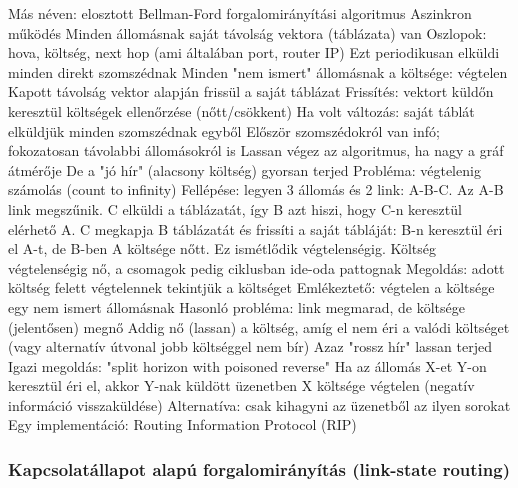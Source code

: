 \documentclass[12pt,a4paper]{article}
\begin{document}
\begin{outline}
	\1 Más néven: elosztott Bellman-Ford forgalomirányítási algoritmus
	\1 Aszinkron működés
	\1 Minden állomásnak saját távolság vektora (táblázata) van
		\2 Oszlopok: hova, költség, next hop (ami általában port, router IP)
		\2 Ezt periodikusan elküldi minden direkt szomszédnak
		\2 Minden "nem ismert" állomásnak a költsége: végtelen
	\1 Kapott távolság vektor alapján frissül a saját táblázat
		\2 Frissítés: vektort küldőn keresztül költségek ellenőrzése (nőtt/csökkent)
		\2 Ha volt változás: saját táblát elküldjük minden szomszédnak egyből
	\1 Először szomszédokról van infó; fokozatosan távolabbi állomásokról is
	\1 Lassan végez az algoritmus, ha nagy a gráf átmérője
		\2 De a "jó hír" (alacsony költség) gyorsan terjed
	\1 Probléma: végtelenig számolás (count to infinity)
		\2 Fellépése: legyen 3 állomás és 2 link: A-B-C. Az A-B link megszűnik. C elküldi a táblázatát, így B azt hiszi, hogy C-n keresztül elérhető A. C megkapja B táblázatát és frissíti a saját tábláját: B-n keresztül éri el A-t, de B-ben A költsége nőtt. Ez ismétlődik végtelenségig.
		\2 Költség végtelenségig nő, a csomagok pedig ciklusban ide-oda pattognak
		\2 Megoldás: adott költség felett végtelennek tekintjük a költséget
			\3 Emlékeztető: végtelen a költsége egy nem ismert állomásnak
		\2 Hasonló probléma: link megmarad, de költsége (jelentősen) megnő
			\3 Addig nő (lassan) a költség, amíg el nem éri a valódi költséget (vagy alternatív útvonal jobb költséggel nem bír)
			\3 Azaz "rossz hír" lassan terjed
		\2 Igazi megoldás: "split horizon with poisoned reverse"
			\3 Ha az állomás X-et Y-on keresztül éri el, akkor Y-nak küldött üzenetben X költsége végtelen (negatív információ visszaküldése)
			\3 Alternatíva: csak kihagyni az üzenetből az ilyen sorokat
	\1 Egy implementáció: Routing Information Protocol (RIP)
\end{outline}

\subsubsection{Kapcsolatállapot alapú forgalomirányítás (link-state routing)}
\end{document}
